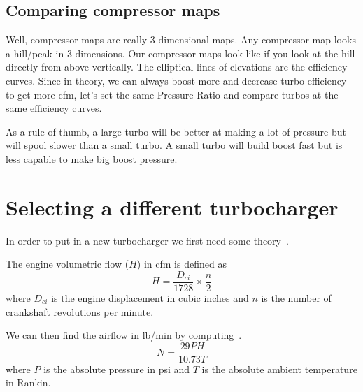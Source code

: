 \documentclass[11pt,a4paper]{book}
\begin{document}
\subsection{Comparing compressor maps}
Well, compressor maps are really 3-dimensional maps. Any compressor map looks a hill/peak in 3
dimensions. Our compressor maps look like if you look at the hill directly from above vertically. The
elliptical lines of elevations are the efficiency curves. Since in theory, we can always boost more and
decrease turbo efficiency to get more cfm, let’s set the same Pressure Ratio and compare turbos at
the same efficiency curves.

As a rule of thumb, a large turbo will be better at making a lot of pressure but will spool slower than a
small turbo. A small turbo will build boost fast but is less capable to make big boost pressure.

\section{Selecting a different turbocharger}
In order to put in a new turbocharger we first need some
theory~\cite{Isaac-Lowry2004}.
\begin{definition}
    The engine volumetric
    flow ($H$) in cfm is defined as
    \begin{equation}
        H=\frac{D_{ci}}{1728}\times\frac{n}{2}
        \label{eqn:volumetric-flow}
    \end{equation}
    where $D_{ci}$ is the engine displacement in cubic inches and $n$ is the number
    of crankshaft revolutions per minute.
    \label{}
\end{definition}
We can then find the airflow in lb/min by computing~\cite{Isaac-Lowry2004}.
\begin{equation}
    N=\frac{29PH}{10.73T}
    \label{eqn:airflow}
\end{equation}
where $P$ is the absolute pressure in psi and $T$ is the absolute ambient
temperature in Rankin.
\end{document}
